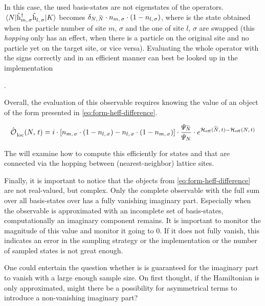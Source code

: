 In this case, the used basis-states are not eigenstates of the operators. 
$\bracketHelper{N}{\withspinhcop{m}{\sigma}{\dagger}\withspinhcop{l}{\sigma}{}}{K}$ becomes $\delta_{N,\,\vphantom{N}\smash{\tilde{N}}}\cdot n_{m,\,\sigma} \cdot (1-n_{l,\,\sigma} )$, where  is the state obtained when the particle number of site $m,\, \sigma$ and the one of site $l,\, \sigma$ are swapped (this \emph{hopping} only has an effect, when there is a particle on the original site and no particle yet on the target site, or vice versa).
Evaluating the whole operator with the signs correctly and in an efficient manner can best be looked up in the implementation 

.

Overall, the evaluation of this observable requires knowing the value of an object of the form presented in \autoref{eq:form-heff-difference}.

\begin{equation}
    \label{eq:form-heff-difference}
    \localObservable{N}{t} =
    i \cdot 
    \left[
        n_{m,\,\sigma} \cdot (1-n_{l,\,\sigma})
        -
        n_{l,\,\sigma} \cdot (1-n_{m,\,\sigma})
    \right]
    \cdot 
    \frac{\psiN[\vphantom{N}\smash{\tilde{N}}]}{\psiN}
    \cdot 
    e^{\HeffOft[\vphantom{N}\smash{\tilde{N}}]-\HeffOft[N]}
\end{equation}

The  will examine how to compute this efficiently for states \ketN[N] and  that are connected via the hopping between (nearest-neighbor) lattice sites.

Finally, it is important to notice that the objects from \autoref{eq:form-heff-difference} are not real-valued, but complex.
Only the complete observable with the full sum over all basis-states \ketN over  has a fully vanishing imaginary part. 
Especially when the observable is approximated with an incomplete set of basis-states, computationally an imaginary component remains. 
It is important to monitor the magnitude of this value and monitor it going to $0$.
If it does not fully vanish, this indicates an error in the sampling strategy or the implementation or the number of sampled states is not great enough.

One could entertain the question whether is is guaranteed for the imaginary part to vanish with a large enough sample size.
On first thought, if the Hamiltonian is only approximated, might there be a possibility for asymmetrical terms to introduce a non-vanishing imaginary part?

